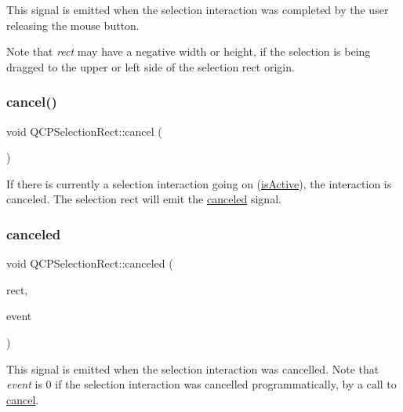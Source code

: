 This signal is emitted when the selection interaction was completed by the user releasing the mouse button.

Note that {\itshape rect} may have a negative width or height, if the selection is being dragged to the upper or left side of the selection rect origin. \mbox{\label{class_q_c_p_selection_rect_af67bc58f4f5ce9a4dc420b9c42de235a}} 
\subsubsection{\texorpdfstring{cancel()}{cancel()}}
{\footnotesize\ttfamily void Q\+C\+P\+Selection\+Rect\+::cancel (\begin{DoxyParamCaption}{ }\end{DoxyParamCaption})}

If there is currently a selection interaction going on (\hyperlink{class_q_c_p_selection_rect_ad27c1569c6ea8fa48e24b81e2a302df3}{is\+Active}), the interaction is canceled. The selection rect will emit the \hyperlink{class_q_c_p_selection_rect_aeb82009393c90130102dccf36477b906}{canceled} signal. \mbox{\label{class_q_c_p_selection_rect_aeb82009393c90130102dccf36477b906}} 
\subsubsection{\texorpdfstring{canceled}{canceled}}
{\footnotesize\ttfamily void Q\+C\+P\+Selection\+Rect\+::canceled (\begin{DoxyParamCaption}\item[{const Q\+Rect \&}]{rect,  }\item[{Q\+Input\+Event $\ast$}]{event }\end{DoxyParamCaption})\hspace{0.3cm}{\ttfamily [signal]}}

This signal is emitted when the selection interaction was cancelled. Note that {\itshape event} is 0 if the selection interaction was cancelled programmatically, by a call to \hyperlink{class_q_c_p_selection_rect_af67bc58f4f5ce9a4dc420b9c42de235a}{cancel}.

